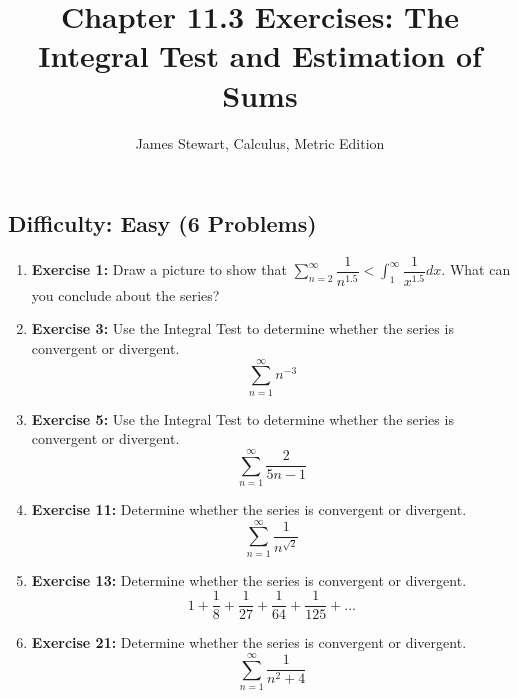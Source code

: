 \documentclass{article}
\title{Chapter 11.3 Exercises: The Integral Test and Estimation of Sums}
\author{James Stewart, Calculus, Metric Edition}
\date{}
\begin{document}
\maketitle
\hrulefill %
\vspace{1em} %

\subsection*{Difficulty: Easy (6 Problems)}
\begin{enumerate}
    \item \textbf{Exercise 1:} Draw a picture to show that $\sum_{n=2}^{\infty} \dfrac{1}{n^{1.5}} < \int_{1}^{\infty} \dfrac{1}{x^{1.5}} dx$. What can you conclude about the series?
    \item \textbf{Exercise 3:} Use the Integral Test to determine whether the series is convergent or divergent.
    \[ \sum_{n=1}^{\infty} n^{-3} \]
    \item \textbf{Exercise 5:} Use the Integral Test to determine whether the series is convergent or divergent.
    \[ \sum_{n=1}^{\infty} \dfrac{2}{5n-1} \]
    \item \textbf{Exercise 11:} Determine whether the series is convergent or divergent.
    \[ \sum_{n=1}^{\infty} \dfrac{1}{n^{\sqrt{2}}} \]
    \item \textbf{Exercise 13:} Determine whether the series is convergent or divergent.
    \[ 1 + \dfrac{1}{8} + \dfrac{1}{27} + \dfrac{1}{64} + \dfrac{1}{125} + \dots \]
    \item \textbf{Exercise 21:} Determine whether the series is convergent or divergent.
    \[ \sum_{n=1}^{\infty} \dfrac{1}{n^2 + 4} \]
\end{enumerate}

\hrulefill
\vspace{1em}

\end{document}
